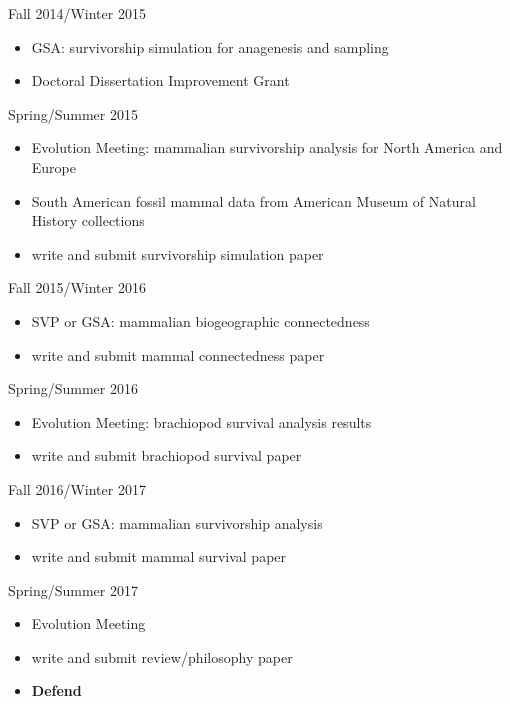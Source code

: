 \documentclass[12pt,letterpaper]{article}
\begin{document}
Fall 2014/Winter 2015
\begin{itemize}
  \item GSA: survivorship simulation for anagenesis and sampling
  \item Doctoral Dissertation Improvement Grant
\end{itemize}

Spring/Summer 2015
\begin{itemize}
  \item Evolution Meeting: mammalian survivorship analysis for North America and Europe
  \item South American fossil mammal data from American Museum of Natural History collections
  \item write and submit survivorship simulation paper
\end{itemize}

Fall 2015/Winter 2016
\begin{itemize}
  \item SVP or GSA: mammalian biogeographic connectedness
  \item write and submit mammal connectedness paper
\end{itemize}

Spring/Summer 2016
\begin{itemize}
  \item Evolution Meeting: brachiopod survival analysis results
  \item write and submit brachiopod survival paper
\end{itemize}

Fall 2016/Winter 2017
\begin{itemize}
  \item SVP or GSA: mammalian survivorship analysis
  \item write and submit mammal survival paper
\end{itemize}

Spring/Summer 2017
\begin{itemize}
  \item Evolution Meeting
  \item write and submit review/philosophy paper
  \item \textbf{Defend}
\end{itemize}



\clearpage


\end{document}

